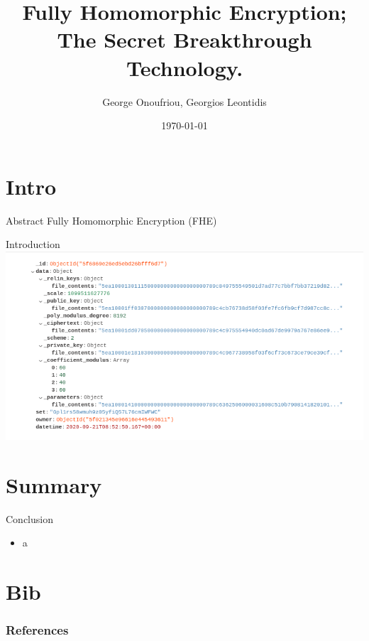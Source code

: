 \documentclass[aspectratio=169]{beamer}
\title{Fully Homomorphic Encryption; The Secret Breakthrough Technology.}
\author{George Onoufriou, Georgios Leontidis}
\date{\today}
\begin{document}

  \frame{\titlepage}

  \section{Intro}

    \begin{frame}{Abstract}
      Fully Homomorphic Encryption (FHE)
    \end{frame}

    \begin{frame}{Introduction}
      \includegraphics[width=0.5\linewidth]{data.png}
    \end{frame}

  \section{Summary}

    \begin{frame}{Conclusion}
      \begin{itemize}
        \item a
      \end{itemize}
    \end{frame}

  \section{Bib}

    \begin{frame}[allowframebreaks]
      \frametitle{References}
      
    \end{frame}
\end{document}
